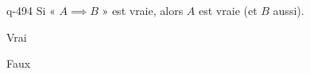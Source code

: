 \begin{truefalse}{q-494}
Si « $A \implies B$ » est vraie, alors $A$ est vraie (et $B$ aussi).
\item Vrai
\item* Faux
\end{truefalse}

